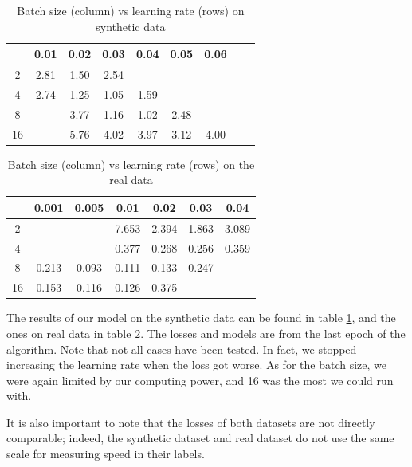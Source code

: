 \documentclass[10pt,conference]{IEEEtran}
\begin{document}
\begin{table}[h]
    \centering
    \begin{tabular}{|c || c | c | c | c | c | c| c | c |} 
        \hline
           & 0.01 & 0.02 & 0.03 & 0.04 & 0.05 & 0.06 \\  
        \hline\hline
        2  & 2.81 & 1.50 & 2.54 &      &      &\\ 
        \hline
        4  & 2.74 & 1.25 & 1.05 & 1.59 &      &\\
        \hline
        8  &      & 3.77 & 1.16 & 1.02 & 2.48 &\\
        \hline
        16 &      & 5.76 & 4.02 & 3.97 & 3.12 & 4.00\\
        \hline
    \end{tabular}
    \caption{Batch size (column) vs learning rate (rows) on synthetic data}
\label{table:syntheticDataResults}
\end{table}
\begin{table}[h]
    \centering
     \begin{tabular}{|c || c | c | c | c | c | c| } 
     \hline
        & 0.001& 0.005 & 0.01  & 0.02 & 0.03 & 0.04 \\  
     \hline\hline
     2  &      &       & 7.653 & 2.394& 1.863& 3.089 \\ 
     \hline
     4  &      &       & 0.377 & 0.268& 0.256& 0.359\\
     \hline
     8  & 0.213&  0.093& 0.111 & 0.133& 0.247&  \\
     \hline
     16 & 0.153&  0.116& 0.126 & 0.375&      &  \\
     \hline
    \end{tabular}
    \caption{Batch size (column) vs learning rate (rows) on the real data}
\label{table:realDataResults}
\end{table}


The results of our model on the synthetic data can be found in table \ref{table:syntheticDataResults}, and the ones on real data in table \ref{table:realDataResults}. The losses and models are from the last epoch of the algorithm. Note that not all cases have been tested. In fact, we stopped increasing the learning rate when the loss got worse. As for the batch size, we were again limited by our computing power, and 16 was the most we could run with.\par
It is also important to note that the losses of both datasets are not directly comparable; indeed, the synthetic dataset and real dataset do not use the same scale for measuring speed in their labels.\par
\end{document}
